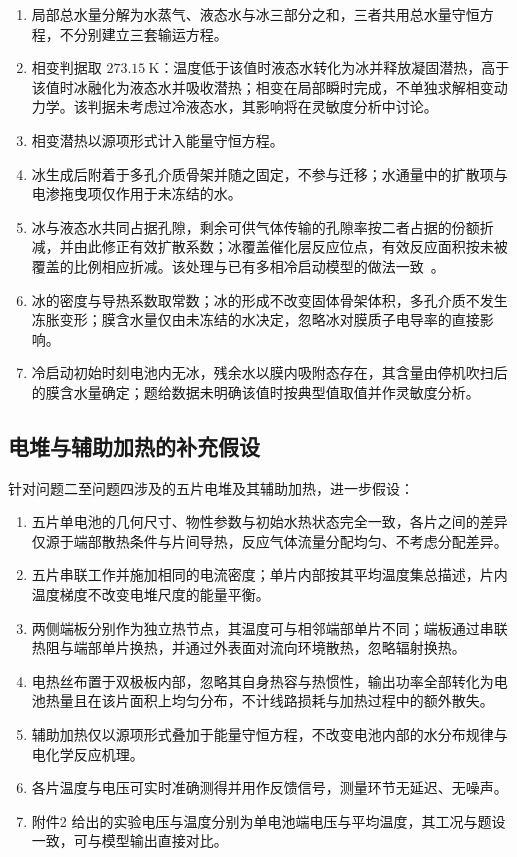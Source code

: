 \documentclass{gmcmthesis}
\begin{document}
\begin{enumerate}
  \item 局部总水量分解为水蒸气、液态水与冰三部分之和，三者共用总水量守恒方程，不分别建立三套输运方程。
  \item 相变判据取 $273.15~\mathrm{K}$：温度低于该值时液态水转化为冰并释放凝固潜热，高于该值时冰融化为液态水并吸收潜热；相变在局部瞬时完成，不单独求解相变动力学。该判据未考虑过冷液态水，其影响将在灵敏度分析中讨论。
  \item 相变潜热以源项形式计入能量守恒方程。
  \item 冰生成后附着于多孔介质骨架并随之固定，不参与迁移；水通量中的扩散项与电渗拖曳项仅作用于未冻结的水。
  \item 冰与液态水共同占据孔隙，剩余可供气体传输的孔隙率按二者占据的份额折减，并由此修正有效扩散系数；冰覆盖催化层反应位点，有效反应面积按未被覆盖的比例相应折减。该处理与已有多相冷启动模型的做法一致~\cite{mao2007multiphase}。
  \item 冰的密度与导热系数取常数；冰的形成不改变固体骨架体积，多孔介质不发生冻胀变形；膜含水量仅由未冻结的水决定，忽略冰对膜质子电导率的直接影响。
  \item 冷启动初始时刻电池内无冰，残余水以膜内吸附态存在，其含量由停机吹扫后的膜含水量确定；题给数据未明确该值时按典型值取值并作灵敏度分析。
\end{enumerate}

\subsection{电堆与辅助加热的补充假设}
针对问题二至问题四涉及的五片电堆及其辅助加热，进一步假设：

\begin{enumerate}
  \item 五片单电池的几何尺寸、物性参数与初始水热状态完全一致，各片之间的差异仅源于端部散热条件与片间导热，反应气体流量分配均匀、不考虑分配差异。
  \item 五片串联工作并施加相同的电流密度；单片内部按其平均温度集总描述，片内温度梯度不改变电堆尺度的能量平衡。
  \item 两侧端板分别作为独立热节点，其温度可与相邻端部单片不同；端板通过串联热阻与端部单片换热，并通过外表面对流向环境散热，忽略辐射换热。
  \item 电热丝布置于双极板内部，忽略其自身热容与热惯性，输出功率全部转化为电池热量且在该片面积上均匀分布，不计线路损耗与加热过程中的额外散失。
  \item 辅助加热仅以源项形式叠加于能量守恒方程，不改变电池内部的水分布规律与电化学反应机理。
  \item 各片温度与电压可实时准确测得并用作反馈信号，测量环节无延迟、无噪声。
  \item 附件2 给出的实验电压与温度分别为单电池端电压与平均温度，其工况与题设一致，可与模型输出直接对比。
\end{enumerate}
\end{document}

